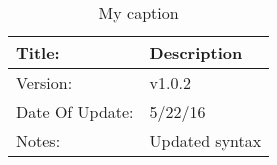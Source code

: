 \begin{table}[]
\centering
\caption{My caption}
\label{my-label}
\begin{tabular}{|l|l|}
\hline
Title:          & Description   \\ \hline
Version:        & v1.0.2        \\ \hline
Date Of Update: & 5/22/16       \\ \hline
Notes:          & Updated syntax\\ \hline
\end{tabular}
\end{table}
